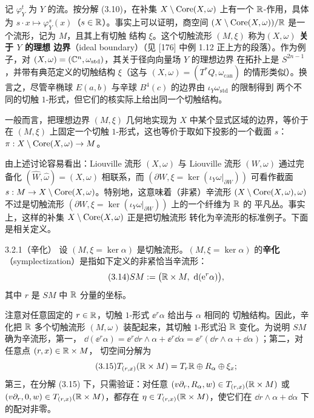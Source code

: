 记 $\varphi^t_Y$ 为 $Y$ 的流。按分解 (3.10)，在补集
$X\setminus\operatorname{Core}(X,\omega)$ 上有一个 $\mathbb{R}$-作用，具体为
$s\cdot x\mapsto\varphi^s_Y(x)$（$s\in\mathbb{R}$）。事实上可以证明，商空间
$(X\setminus\operatorname{Core}(X,\omega))/\mathbb{R}$ 是一个流形，记为 $M$，且其上有切触
结构 $\xi$。这个切触流形 $(M,\xi)$ 称为\textbf{$(X,\omega)$ 关于 $Y$ 的理想
边界}（ideal boundary）（见 [176] 中例 1.12 正上方的段落）。作为例子，对
$(X,\omega)=(\mathbb{C}^n,\omega_{\mathrm{std}})$，其关于径向向量场 $Y$ 的理想边界
在拓扑上是 $S^{2n-1}$，并带有典范定义的切触结构 $\xi$（这与
$(X,\omega)=(T^*Q,\omega_{\mathrm{can}})$ 的情形类似）。换言之，尽管辛椭球
$E(a,b)$ 与辛球 $B^4(c)$ 的边界由 $\iota_Y\omega_{\mathrm{std}}$ 的限制得到
两个不同的切触 $1$-形式，但它们的核实际上给出同一个切触结构。

一般而言，把理想边界 $(M,\xi)$ 几何地实现为 $X$ 中某个显式区域的边界，等价于
在 $(M,\xi)$ 上固定一个切触 $1$-形式，这也等价于取如下投影的一个截面 $s$：
$\pi:X\setminus\operatorname{Core}(X,\omega)\to M$。

由上述讨论容易看出：Liouville 流形 $(X,\omega)$ 与 Liouville 流形
$(W,\omega)$ 通过完备化 $(\widehat W,\widehat\omega)=(X,\omega)$ 相联系，而
$(\partial W,\xi=\ker(\iota_Y\omega|_{\partial W}))$ 可看作截面
$s:M\to X\setminus\operatorname{Core}(X,\omega)$。特别地，这意味着（非紧）辛流形
$(X\setminus\operatorname{Core}(X,\omega),\omega)$ 不过是切触流形
$(\partial W,\xi=\ker(\iota_Y\omega|_{\partial W}))$ 上的一个纤维为 $\mathbb{R}$ 的
平凡丛。事实上，这样的补集 $X\setminus\operatorname{Core}(X,\omega)$ 正是把切触流形
转化为辛流形的标准例子。下面是相关定义。

\begin{wdefn}{3.2.1}（辛化）
设 $(M,\xi=\ker\alpha)$ 是切触流形。$(M,\xi=\ker\alpha)$ 的\textbf{辛化}
（symplectization）是指如下定义的非紧恰当辛流形：
\begin{equation}\tag{3.14}
  SM:=\bigl(\mathbb{R}\times M,\ \mathrm{d}(\mathrm{e}^r\alpha)\bigr),
\end{equation}
其中 $r$ 是 $SM$ 中 $\mathbb{R}$ 分量的坐标。
\end{wdefn}

注意对任意固定的 $r\in\mathbb{R}$，切触 $1$-形式 $\ee^r\alpha$ 给出与 $\alpha$ 相同的
切触结构。因此，辛化把 $\mathbb{R}$ 多个切触流形 $(M,\omega)$ 装配起来，其切触
$1$-形式沿 $\mathbb{R}$ 变化。为说明 $SM$ 确为辛流形，第一，
$\dd(\ee^r\alpha)=\ee^r\dd r\wedge\alpha+\ee^r\dd\alpha
=\ee^r(\dd r\wedge\alpha+\dd\alpha)$；第二，对任意点 $(r,x)\in\mathbb{R}\times M$，
切空间分解为
\begin{equation}\tag{3.15}
  T_{(r,x)}(\mathbb{R}\times M)=T_r\mathbb{R}\oplus R_\alpha\oplus\xi_x;
\end{equation}
第三，在分解 (3.15) 下，只需验证：对任意
$(v\partial_r,R_\alpha,w)\in T_{(r,x)}(\mathbb{R}\times M)$ 或
$(v\partial_r,0,w)\in T_{(r,x)}(\mathbb{R}\times M)$，都存在
$\eta\in T_{(r,x)}(\mathbb{R}\times M)$，使它们在 $\dd r\wedge\alpha+\dd\alpha$
下的配对非零。

